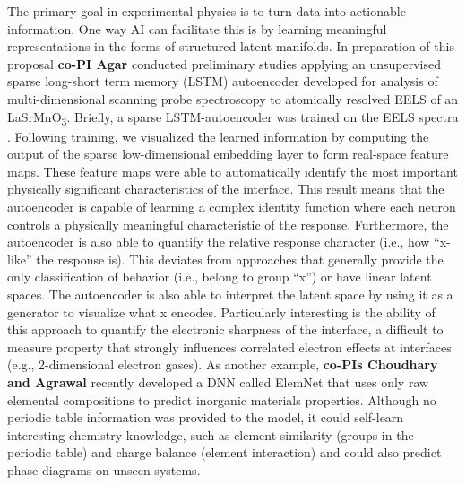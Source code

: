  The primary goal in experimental physics is to turn data into actionable information. One way AI can facilitate this is by learning meaningful representations in the forms of structured latent manifolds. In preparation of this proposal \textbf{co-PI Agar} conducted preliminary studies applying an unsupervised sparse long-short term memory (LSTM) autoencoder developed for analysis of multi-dimensional scanning probe spectroscopy to atomically resolved EELS of an LaSrMnO\textsubscript{3}. Briefly, a sparse LSTM-autoencoder was trained on the EELS spectra \cite{agar_revealing_2019}. Following training, we visualized the learned information by computing the output of the sparse low-dimensional embedding layer to form real-space feature maps. These feature maps were able to automatically identify the most important physically significant characteristics of the interface. This result means that the autoencoder is capable of learning a complex identity function where each neuron controls a physically meaningful characteristic of the response. Furthermore, the autoencoder is also able to quantify the relative response character (i.e., how “x-like” the response is). This deviates from approaches that generally provide the only classification of behavior (i.e., belong to group “x”) or have linear latent spaces. The autoencoder is also able to interpret the latent space by using it as a generator to visualize what x encodes.
Particularly interesting is the ability of this approach to quantify the electronic sharpness of the interface, a difficult to measure property that strongly influences correlated electron effects at interfaces (e.g., 2-dimensional electron gases). 
As another example, \textbf{co-PIs Choudhary and Agrawal} recently developed a DNN called ElemNet \cite{Jha_SciRep18} that uses only raw elemental compositions to predict inorganic materials properties. Although no periodic table information was provided to the model, it could self-learn interesting chemistry knowledge, such as element similarity (groups in the periodic table) and charge balance (element interaction) and could also predict phase diagrams on unseen systems. 

